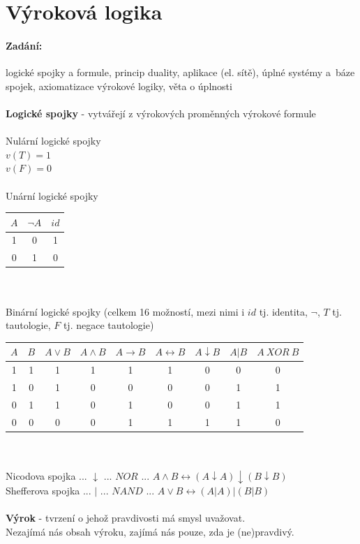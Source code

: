 \documentclass[a4]{report}
\theoremstyle{definition}
\begin{document}
\newpage

\section{Výroková logika}
% 
% 
% 
\paragraph*{Zadání:}
logické spojky a formule, princip duality, aplikace (el. sítě),
úplné systémy a~báze spojek, axiomatizace výrokové logiky, věta o úplnosti\\
~\\
\textbf{Logické spojky} - vytvářejí z výrokových proměnných výrokové formule\\~\\
Nulární logické spojky\\
$v(T) = 1$\\
$v(F) = 0$\\~\\
%
Unární logické spojky\\
\begin{tabular}{|c||c|c|}
\hline 
$A$ & $\neg A$ & $id$ \\ 
\hline 
1 & 0 & 1 \\ 
0 & 1 & 0 \\ 
\hline 
\end{tabular} ~\\~\\
%
Binární logické spojky (celkem 16 možností, mezi nimi i $id$ tj. identita, $\neg$, $T$ tj. tautologie, $F$ tj. negace tautologie)\\
\begin{tabular}{|c|c||c|c|c|c|c|c|c|}
\hline 
$A$ & $B$ & $A \vee B$ & $A \wedge B$ & $A \rightarrow B$ & $A \leftrightarrow B$ & $A\downarrow B$ & $A\vert B$ & $A~XOR~B$ \\ 
\hline 
1 & 1 & 1 & 1 & 1 & 1 & 0 & 0 & 0 \\ 
1 & 0 & 1 & 0 & 0 & 0 & 0 & 1 & 1 \\ 
0 & 1 & 1 & 0 & 1 & 0 & 0 & 1 & 1 \\ 
0 & 0 & 0 & 0 & 1 & 1 & 1 & 1 & 0 \\ 
\hline 
\end{tabular} ~\\~\\
Nicodova spojka ... $ \downarrow $ ... $NOR$ ... $A\wedge B \leftrightarrow (A\downarrow A)\downarrow (B\downarrow B)$\\
Shefferova spojka ... $ \vert $ ... $NAND$ ... $A\vee B \leftrightarrow (A\vert A)\vert (B\vert B)$\\~\\
%
\textbf{Výrok} - tvrzení o jehož pravdivosti má smysl uvažovat.\\
Nezajímá nás obsah výroku, zajímá nás pouze, zda je (ne)pravdivý.
\end{document}
